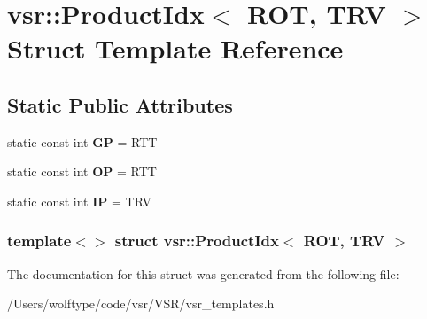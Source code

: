 \hypertarget{structvsr_1_1_product_idx_3_01_r_o_t_00_01_t_r_v_01_4}{\section{vsr\-:\-:Product\-Idx$<$ R\-O\-T, T\-R\-V $>$ Struct Template Reference}
\label{structvsr_1_1_product_idx_3_01_r_o_t_00_01_t_r_v_01_4}
}
\subsection*{Static Public Attributes}
\begin{DoxyCompactItemize}
\item 
\hypertarget{structvsr_1_1_product_idx_3_01_r_o_t_00_01_t_r_v_01_4_a2952a06bd12c51ef8030d2853dace478}{static const int {\bfseries G\-P} = R\-T\-T}\label{structvsr_1_1_product_idx_3_01_r_o_t_00_01_t_r_v_01_4_a2952a06bd12c51ef8030d2853dace478}

\item 
\hypertarget{structvsr_1_1_product_idx_3_01_r_o_t_00_01_t_r_v_01_4_ad987085349dbf61d2a790586a4d7ed1f}{static const int {\bfseries O\-P} = R\-T\-T}\label{structvsr_1_1_product_idx_3_01_r_o_t_00_01_t_r_v_01_4_ad987085349dbf61d2a790586a4d7ed1f}

\item 
\hypertarget{structvsr_1_1_product_idx_3_01_r_o_t_00_01_t_r_v_01_4_aa732ded9a314caf2db16dcdbca8b4e92}{static const int {\bfseries I\-P} = T\-R\-V}\label{structvsr_1_1_product_idx_3_01_r_o_t_00_01_t_r_v_01_4_aa732ded9a314caf2db16dcdbca8b4e92}

\end{DoxyCompactItemize}
\subsubsection*{template$<$$>$ struct vsr\-::\-Product\-Idx$<$ R\-O\-T, T\-R\-V $>$}



The documentation for this struct was generated from the following file\-:\begin{DoxyCompactItemize}
\item 
/\-Users/wolftype/code/vsr/\-V\-S\-R/vsr\-\_\-templates.\-h\end{DoxyCompactItemize}
